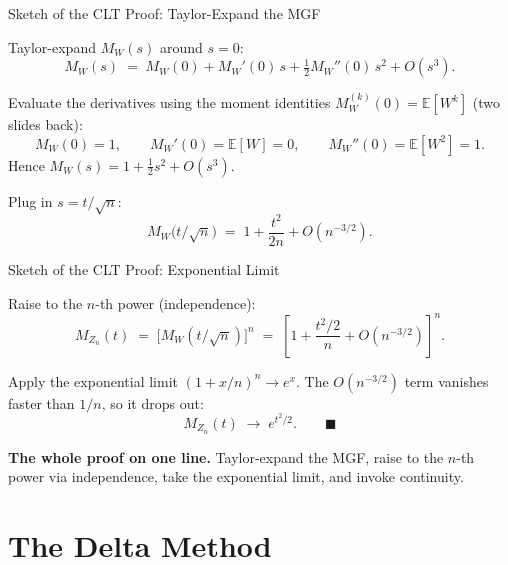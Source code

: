 \documentclass[aspectratio=169, handout, t]{beamer}
\numberwithin{equation}{section}
\begin{document}

\begin{frame}{Sketch of the CLT Proof: Taylor-Expand the MGF}

Taylor-expand $M_W(s)$ around $s=0$:
\[
M_W(s) \;=\; M_W(0) + M_W'(0)\,s + \tfrac{1}{2}M_W''(0)\,s^2 + O(s^3).
\]

\pause

\medskip

Evaluate the derivatives using the moment identities $M_W^{(k)}(0) = \mathbb{E}[W^k]$ (two slides back):
\[
M_W(0) = 1, \qquad M_W'(0) = \mathbb{E}[W] = 0, \qquad M_W''(0) = \mathbb{E}[W^2] = 1.
\]
Hence $M_W(s) = 1 + \tfrac{1}{2}s^2 + O(s^3).$

\pause

\medskip

Plug in $s = t/\sqrt n$:
\[
M_W\!\bigl(t/\sqrt n\bigr) \;=\; 1 + \frac{t^2}{2n} + O(n^{-3/2}).
\]

\end{frame}


\begin{frame}{Sketch of the CLT Proof: Exponential Limit}

Raise to the $n$-th power (independence):
\[
M_{Z_n}(t) \;=\; \bigl[M_W(t/\sqrt n)\bigr]^n \;=\; \left[1 + \frac{t^2/2}{n} + O(n^{-3/2})\right]^n.
\]

\pause

\medskip

Apply the exponential limit $(1 + x/n)^n \to e^x$. The $O(n^{-3/2})$ term vanishes faster than $1/n$, so it drops out:
\[
M_{Z_n}(t) \;\longrightarrow\; e^{t^2/2}. \qquad \blacksquare
\]

\pause

\medskip

\begin{tcolorbox}[colback=blue!5, colframe=blue!50]
\textbf{The whole proof on one line.} Taylor-expand the MGF, raise to the $n$-th power via independence, take the exponential limit, and invoke continuity.
\end{tcolorbox}

\end{frame}

\section{The Delta Method}
\setcounter{subsection}{1}
\end{document}
